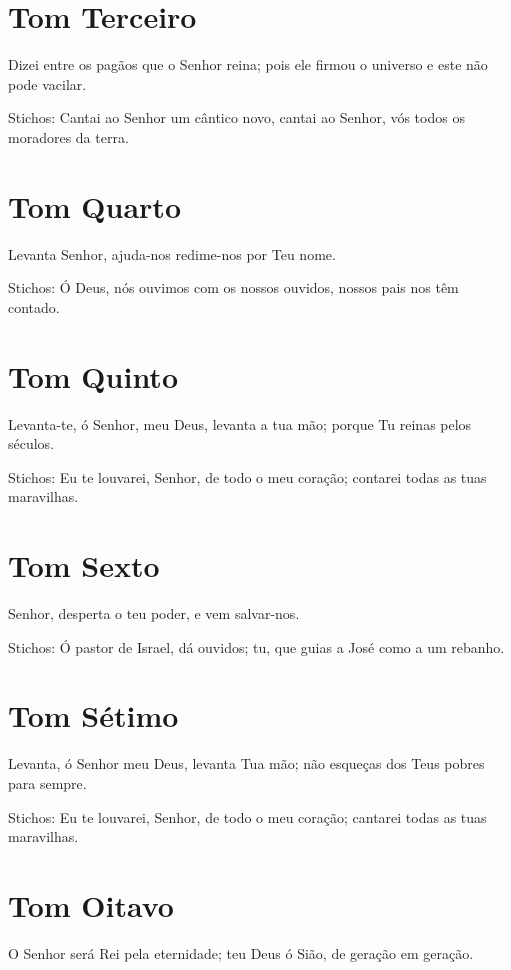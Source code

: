 \documentclass{subfiles}
\begin{document}
\section*{Tom Terceiro}

Dizei entre os pagãos que o Senhor reina;  pois ele firmou o universo
e este não pode vacilar.

Stichos: Cantai ao Senhor um cântico novo, cantai ao Senhor, vós todos os
moradores da terra.

\section*{Tom Quarto}

Levanta Senhor, ajuda-nos  redime-nos por Teu nome.

Stichos: Ó Deus, nós ouvimos com os nossos ouvidos, nossos pais nos têm
contado.

\section*{Tom Quinto}

Levanta-te, ó Senhor, meu Deus, levanta a tua mão; porque Tu reinas
pelos séculos.

Stichos: Eu te louvarei, Senhor, de todo o meu coração; contarei todas as tuas
maravilhas.

\section*{Tom Sexto}

Senhor, desperta o teu poder,  e vem salvar-nos.

Stichos: Ó pastor de Israel, dá ouvidos; tu, que guias a José como a um rebanho.

\section*{Tom Sétimo}

Levanta, ó Senhor meu Deus, levanta Tua mão;  não esqueças dos
Teus pobres para sempre.

Stichos: Eu te louvarei, Senhor, de todo o meu coração; cantarei todas as tuas
maravilhas.

\section*{Tom Oitavo}

O Senhor será Rei pela eternidade;  teu Deus ó Sião, de geração em geração.
\end{document}
